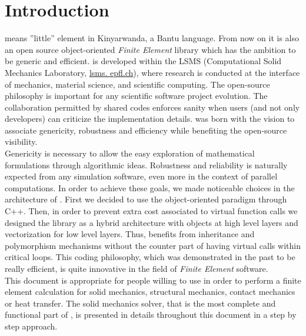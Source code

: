 \chapter{Introduction}

\akantu means ''little'' element in Kinyarwanda, a
Bantu language. From now on it is also an open source
object-oriented \textit{Finite Element} library which has the ambition
to be generic and efficient.
\akantu is developed within the LSMS (Computational Solid Mechanics Laboratory, \url{lsms.
epfl.ch}), where research is conducted at the interface of mechanics, material
science, and scientific computing. 
The open-source philosophy is important for any
scientific software project evolution. The collaboration
permitted by shared codes enforces sanity when users (and not
only developers) can criticize the implementation details.
\akantu was born with the vision to associate genericity, robustness 
and efficiency while benefiting the open-source visibility.\\

Genericity is necessary to allow the easy exploration of mathematical
formulations through algorithmic ideas. Robustness and reliability
is naturally expected from any simulation software, even more 
in the context of parallel computations. 
In order to achieve these goals, we made noticeable choices in
the architecture of \akantu. First we decided to use the object-oriented
paradigm through C++. Then, in order to prevent extra cost associated 
to virtual function calls we designed the library as
a hybrid architecture with objects at high level layers and
vectorization for low level layers. Thus, \akantu benefits from
inheritance and polymorphism mechanisms without the counter
part of having virtual calls within critical loops. 
This coding philosophy, which was demonstrated in the past to be really 
efficient, is quite innovative in the field of \textit{Finite Element} software. \\

This document is appropriate for people willing to use \akantu
in order to perform a finite element calculation for solid mechanics,
structural mechanics, contact mechanics or heat transfer. The solid mechanics solver, 
that is the most complete and functional part of \akantu, is presented in details throughout 
this document in a step by step approach. 


